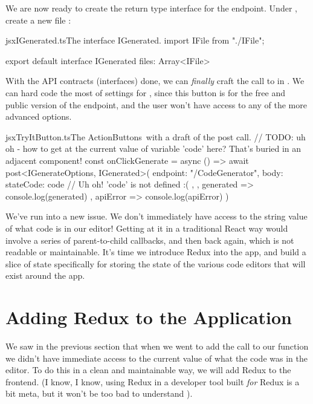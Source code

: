 \documentclass[a4paper,headinclude=on,footinclude=on,12pt,oneside]{scrbook}
\begin{document}

We are now ready to create the return type interface for the  endpoint. Under , create a new file : 

\begin{codeInput}{jsx}{IGenerated.ts}{The interface IGenerated.}
import IFile from "./IFile";

export default interface IGenerated {
    files: Array<IFile>
}
\end{codeInput}

With the API contracts (interfaces) done, we can \textit{finally} craft the call to  in . We can hard code the most of settings for , since this button is for the free and public version of the endpoint, and the user won't have access to any of the more advanced options.

\begin{codeInput}{jsx}{TryItButton.ts}{The ActionButtons\, with a draft of the post call.}
// TODO: uh oh - how to get at the current value of variable 'code' here? That's buried in an adjacent component!
const onClickGenerate = async () => {
  await post<IGenerateOptions, IGenerated>(
    {
      endpoint: "/CodeGenerator",
      body: {
        stateCode: code // Uh oh! 'code' is not defined :(
      },
    },
    generated => {
      console.log(generated)
    },
    apiError => {
      console.log(apiError)
    }
  )
}
\end{codeInput}

We've run into a new issue. We don't immediately have access to the string value of what code is in our editor! Getting at it in a traditional React way would involve a series of parent-to-child callbacks, and then back again, which is not readable or maintainable. It's time we introduce Redux into the app, and build a slice of state specifically for storing the state of the various code editors that will exist around the app.

\section{Adding Redux to the Application}

We saw in the previous section that when we went to add the call to our  function we didn't have immediate access to the current value of what the code was in the editor. To do this in a clean and maintainable way, we will add Redux to the frontend. (I know, I know, using Redux in a developer tool built \textit{for} Redux is a bit meta, but it won't be too bad to understand \wink). 
\end{document}
